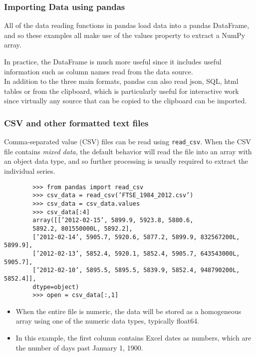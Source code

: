 \documentclass[KSmainSlides.tex]{subfiles}
\begin{document}
	\begin{frame}[fragile]
	\frametitle{Importing Data using pandas}
	
	
	All of the data reading functions in pandas load data into a pandas
	DataFrame, and so these examples all make use of the values property to extract a
	NumPy array. 
	
	\noindent In practice, the DataFrame is much more useful since it includes useful information such
	as column names read from the data source. \\
	In addition to the three main formats, pandas can
	also read json, SQL, html tables or from the clipboard, which is particularly useful for interactive work
	since virtually any source that can be copied to the clipboard can be imported.
\end{frame}
\begin{frame}[fragile]
	\frametitle{CSV and other formatted text files}
	
	Comma-separated value (CSV) files can be read using \texttt{read\_csv}. When the CSV file contains \textit{mixed data},
	the default behavior will read the file into an array with an object data type, and so further processing is
	usually required to extract the individual series.
\end{frame}
\begin{frame}[fragile]
	\begin{framed}
		\begin{verbatim}
		>>> from pandas import read_csv
		>>> csv_data = read_csv(’FTSE_1984_2012.csv’)
		>>> csv_data = csv_data.values
		>>> csv_data[:4]
		array([[’2012-02-15’, 5899.9, 5923.8, 5880.6, 
		5892.2, 801550000L, 5892.2],
		[’2012-02-14’, 5905.7, 5920.6, 5877.2, 5899.9, 832567200L, 5899.9],
		[’2012-02-13’, 5852.4, 5920.1, 5852.4, 5905.7, 643543000L, 5905.7],
		[’2012-02-10’, 5895.5, 5895.5, 5839.9, 5852.4, 948790200L, 5852.4]], 
		dtype=object)
		>>> open = csv_data[:,1]
		\end{verbatim}
	\end{framed}
\end{frame}
\begin{frame}[fragile]
\begin{itemize}
\item 	When the entire file is numeric, the data will be stored as a homogeneous array using one of the numeric
	data types, typically float64. 
	\item In this example, the first column contains Excel dates as numbers, which are
	the number of days past January 1, 1900.
\end{itemize}

\end{frame}
\end{document}
